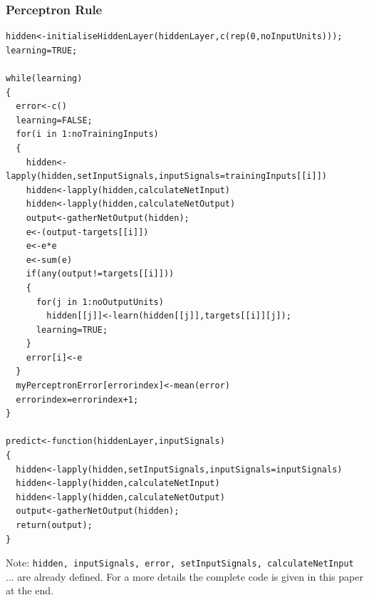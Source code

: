 \documentclass[a4paper,12pt]{report}
\begin{document}
\subsubsection*{Perceptron Rule}
\begin{verbatim}
hidden<-initialiseHiddenLayer(hiddenLayer,c(rep(0,noInputUnits)));
learning=TRUE;

while(learning)
{
  error<-c()
  learning=FALSE;
  for(i in 1:noTrainingInputs)
  {
    hidden<-lapply(hidden,setInputSignals,inputSignals=trainingInputs[[i]])
    hidden<-lapply(hidden,calculateNetInput)
    hidden<-lapply(hidden,calculateNetOutput)
    output<-gatherNetOutput(hidden);
    e<-(output-targets[[i]])
    e<-e*e
    e<-sum(e)
    if(any(output!=targets[[i]]))
    {
      for(j in 1:noOutputUnits)
        hidden[[j]]<-learn(hidden[[j]],targets[[i]][j]);
      learning=TRUE;
    }
    error[i]<-e
  }
  myPerceptronError[errorindex]<-mean(error)
  errorindex=errorindex+1;
}

predict<-function(hiddenLayer,inputSignals)
{
  hidden<-lapply(hidden,setInputSignals,inputSignals=inputSignals)
  hidden<-lapply(hidden,calculateNetInput)
  hidden<-lapply(hidden,calculateNetOutput)
  output<-gatherNetOutput(hidden);
  return(output);
}

\end{verbatim}
Note:
\verb+hidden, inputSignals, error, setInputSignals, calculateNetInput+ ... are already defined. For a more details
the complete code is given in this paper at the end.
\end{document}
